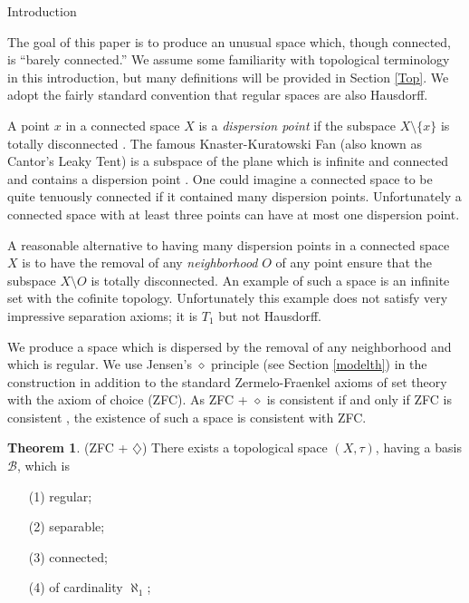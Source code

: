 \documentclass{amsart}
\theoremstyle{definition}\newtheorem{theorem}{Theorem}
\theoremstyle{definition}\newtheorem{bigtheorem}{Theorem}
\numberwithin{theorem}{section}
\theoremstyle{definition}\newtheorem{corollary}[theorem]{Corollary}
\theoremstyle{definition}\newtheorem{proposition}[theorem]{Proposition}
\theoremstyle{definition}\newtheorem{definition}[theorem]{Definition}
\theoremstyle{definition}\newtheorem{question}[theorem]{Question}
\theoremstyle{definition}\newtheorem{example}[theorem]{Example}
\theoremstyle{definition}\newtheorem{remark}[theorem]{Remark}
\theoremstyle{definition}\newtheorem{note}[theorem]{Note}
\theoremstyle{definition}\newtheorem{lemma}[theorem]{Lemma}
\theoremstyle{definition}\newtheorem{fact}[theorem]{Fact}
\theoremstyle{definition}\newtheorem{define}[theorem]{Definition}
\theoremstyle{definition}\newtheorem{definitions}[theorem]{Definitions}
\theoremstyle{definition}\newtheorem{claim}[theorem]{Claim}
\theoremstyle{definition}\newtheorem{obs}[theorem]{Observation}
\theoremstyle{definition}\newtheorem{construction}[theorem]{Construction}
\newcommand{\Bo}{\mathcal{B}}
\begin{document}
\begin{section}{Introduction}

The goal of this paper is to produce an unusual space which, though connected, is ``barely connected.''  We assume some familiarity with topological terminology in this introduction, but many definitions will be provided in Section \ref{Top}.  We adopt the fairly standard convention that regular spaces are also Hausdorff.

A point $x$ in a connected space $X$ is a \emph{dispersion point} if the subspace $X \setminus \{x\}$ is totally disconnected \cite{StSe}.  The famous Knaster-Kuratowski Fan (also known as Cantor's Leaky Tent) is a subspace of the plane which is infinite and connected and contains a dispersion point \cite{KnKu}.  One could imagine a connected space to be quite tenuously connected if it contained many dispersion points.  Unfortunately a connected space with at least three points can have at most one dispersion point.

A reasonable alternative to having many dispersion points in a connected space $X$ is to have the removal of any \emph{neighborhood} $O$ of any point ensure that the subspace $X \setminus O$ is totally disconnected.  An example of such a space is an infinite set with the cofinite topology.  Unfortunately this example does not satisfy very impressive separation axioms; it is $T_1$ but not Hausdorff.

We produce a space which is dispersed by the removal of any neighborhood and which is regular.  We use Jensen's $\diamond$ principle (see Section \ref{modelth}) in the construction in addition to the standard Zermelo-Fraenkel axioms of set theory with the axiom of choice (ZFC).  As ZFC + $\diamond$ is consistent if and only if ZFC is consistent \cite{Jen}, the existence of such a space is consistent with ZFC.

\begin{theorem}(ZFC + $\diamondsuit$) \label{main}  There exists a topological space $(X, \tau)$, having a basis $\Bo$, which is

\begin{enumerate}

\item[(1)] regular;

\item[(2)] separable;

\item[(3)] connected;

\item[(4)] of cardinality $\aleph_1$;


\end{enumerate}
\end{theorem}
\end{section}
\end{document}

